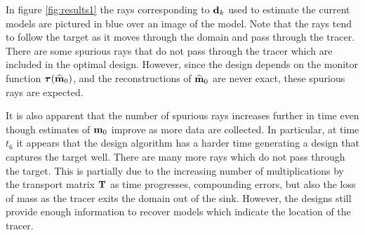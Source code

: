 \documentclass[final,leqno,onefignum,onetabnum]{siamltexmm}
\begin{document}
  In figure \ref{fig:results1} the rays corresponding to ${\bf{d}}_k$ used to estimate the current models are pictured in blue over an image of the model. Note that the rays tend to follow the target as it moves through the domain and pass through the tracer.
There are some spurious rays that do not pass through the tracer which are included in the optimal design. However, since the design depends on the monitor function  ${\boldsymbol \tau}({\widehat{{\bf{m}}}}_0)$, and the reconstructions of ${\widehat{{\bf{m}}}}_0$ are never exact,  these spurious rays are expected. 

It is also apparent that the number of spurious rays increases further in time even though estimates of ${\bf{m}}_0$ improve as more data are collected. In particular, at time $t_6$ it appears that the design algorithm has a harder time generating a design that captures the target well. There are many more rays which do not pass through the target. This is partially due to the increasing number of multiplications by the transport matrix ${\bf{T}}$ as time progresses, compounding errors, but also the loss of mass as the tracer exits the domain out of the sink. However, the designs still provide enough information to recover models which indicate the location of the tracer.  
\end{document}
